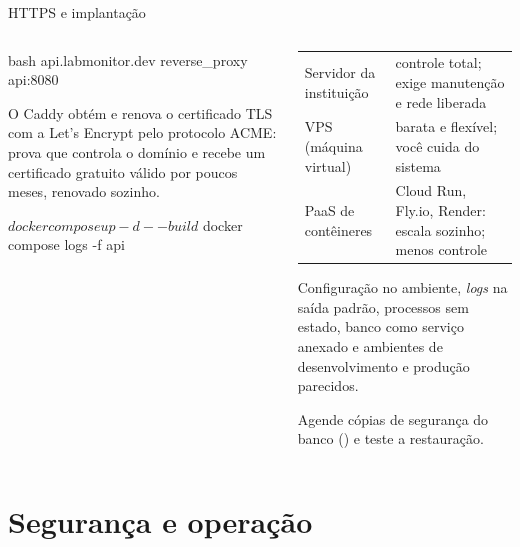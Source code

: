 \documentclass[aspectratio=169,10pt]{beamer}
\begin{document}
\begin{frame}[fragile]{HTTPS e implantação}
  \begin{columns}[T]
    \begin{column}{0.48\textwidth}
\begin{codigo}[title=Caddyfile]{bash}
api.labmonitor.dev {
  reverse_proxy api:8080
}
\end{codigo}
      \begin{pordentro}
        O Caddy obtém e renova o certificado TLS com a Let's Encrypt pelo protocolo ACME: prova que controla o domínio e recebe um certificado gratuito válido por poucos meses, renovado sozinho.
      \end{pordentro}
\begin{terminal}
$ docker compose up -d --build
$ docker compose logs -f api
\end{terminal}
    \end{column}
    \begin{column}{0.5\textwidth}
      \scriptsize
      \begin{tabularx}{\linewidth}{@{}l L@{}}
        \toprule
         &  \\
        \midrule
        Servidor da instituição & controle total; exige manutenção e rede liberada \\
        VPS (máquina virtual) & barata e flexível; você cuida do sistema \\
        PaaS de contêineres & Cloud Run, Fly.io, Render: escala sozinho; menos controle \\
        \bottomrule
      \end{tabularx}
      \begin{conceito}
        Configuração no ambiente, \emph{logs} na saída padrão, processos sem estado, banco como serviço anexado e ambientes de desenvolvimento e produção parecidos.
      \end{conceito}
      \begin{atencao}
        Agende cópias de segurança do banco () e teste a restauração.
      \end{atencao}
    \end{column}
  \end{columns}
\end{frame}

\section{Segurança e operação}
\end{document}
